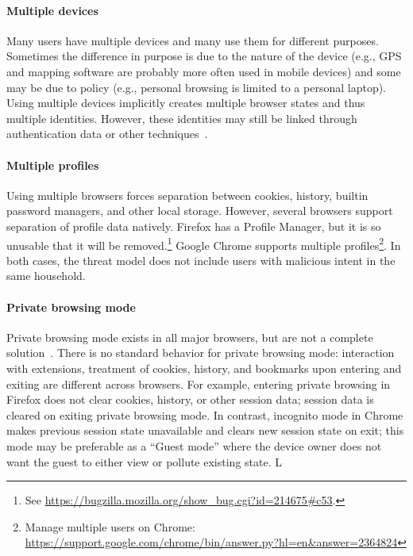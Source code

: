 \documentclass[10pt, conference, compsocconf]{IEEEtran}
\begin{document}
\paragraph{Multiple devices}

Many users have multiple devices and many use them for different purposes.
Sometimes the difference in purpose is due to the nature of the device (e.g.,
GPS and mapping software are probably more often used in mobile devices) and
some may be due to policy (e.g., personal browsing is limited to a personal
laptop). Using multiple devices implicitly creates multiple browser states and
thus multiple identities.  However, these identities may still be linked
through authentication data or other techniques~\cite{aol}.

\paragraph{Multiple profiles}

Using multiple browsers forces separation between cookies, history, builtin
password managers, and other local storage. However, several browsers support
separation of profile data natively. Firefox has a Profile Manager, but it is
so unusable that it will be removed.\footnote{See
\url{https://bugzilla.mozilla.org/show\_bug.cgi?id=214675\#c53}.} Google Chrome
supports multiple profiles\footnote{Manage multiple users on Chrome:
\url{https://support.google.com/chrome/bin/answer.py?hl=en&answer=2364824}}. In
both cases, the threat model does not include users with malicious intent in
the same household.

\paragraph{Private browsing mode}
Private browsing mode exists in all major browsers, but are not a complete
solution~\cite{ABBJ10}. There is no standard behavior for private browsing
mode: interaction with extensions, treatment of cookies, history, and
bookmarks upon entering and exiting are different across browsers.
For example, entering private browsing in Firefox does not clear
cookies, history, or other session data; session data is cleared on exiting
private browsing mode. In contrast, incognito mode in Chrome makes previous
session state unavailable and clears new session state on exit; this mode
may be preferable as a ``Guest mode'' where the device owner does not want the
guest to either view or pollute existing state. L
\end{document}
